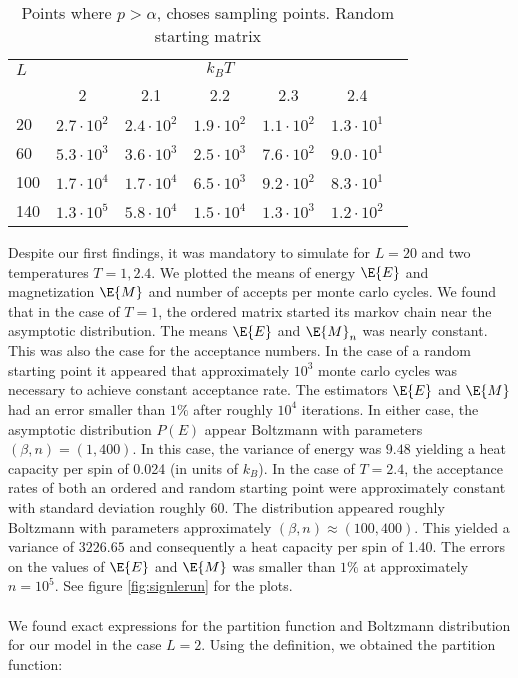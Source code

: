 \documentclass[11pt,english,a4paper]{article}
\begin{document}
\begin{table}[!h]
\center
\begin{tabular}{l c c c c c c}
$L$ & \multicolumn{5}{c}{$k_BT$} \\
		&2					&2.1			&2.2			&2.3			&2.4\\
\hline
20  	&$2.7\cdot 10^2$	&$2.4\cdot 10^2$&$1.9\cdot 10^2$&$1.1\cdot 10^2$&$1.3\cdot 10^1$\\
60		&$5.3\cdot 10^3$	&$3.6\cdot 10^3$&$2.5\cdot 10^3$&$7.6\cdot 10^2$&$9.0\cdot 10^1$\\
100		&$1.7\cdot 10^4$	&$1.7\cdot 10^4$&$6.5\cdot 10^3$&$9.2\cdot 10^2$&$8.3\cdot 10^1$\\
140		&$1.3\cdot 10^5$	&$5.8\cdot 10^4$&$1.5\cdot 10^4$&$1.3\cdot 10^3$&$1.2\cdot 10^2$
\end{tabular}
\caption{Points where $p > \alpha$, choses sampling points. Random starting matrix} \label{tab:sprand}
\end{table}%
Despite our first findings, it was mandatory to simulate for $L=20$ and two temperatures $T=1, 2.4$. We plotted the means of energy $\E{E}$ and magnetization $\E{M}$ and number of accepts per monte carlo cycles. We found that in the case of $T=1$, the ordered matrix started its markov chain near the asymptotic distribution. The means $\E{E}$ and $\E{M}_n$ was nearly constant. This was also the case for the acceptance numbers. In the case of a random starting point it appeared that approximately $10^3$ monte carlo cycles was necessary to achieve constant acceptance rate. The estimators $\E{E}$ and $\E{M}$ had an error smaller than $1\%$ after roughly $10^4$ iterations. In either case, the asymptotic distribution $P(E)$ appear Boltzmann with parameters $(\beta,n) = (1,400)$. In this case, the variance of energy was $9.48$ yielding a heat capacity per spin of 0.024 (in units of $k_B$).
In the case of $T = 2.4$, the acceptance rates of both an ordered and random starting point were approximately constant with standard deviation roughly 60. The distribution appeared roughly Boltzmann with parameters approximately $(\beta,n) \approx (100,400)$. This yielded a variance of $3226.65$ and consequently a heat capacity per spin of 1.40. The errors on the values of $\E{E}$ and $\E{M}$ was smaller than $1 \%$ at approximately $n = 10^5$. See figure \ref{fig:signlerun} for the plots.\\
\\
We found exact expressions for the partition function and Boltzmann distribution for our model in the case $L=2$. Using the definition, we obtained the partition function:
\end{document}
